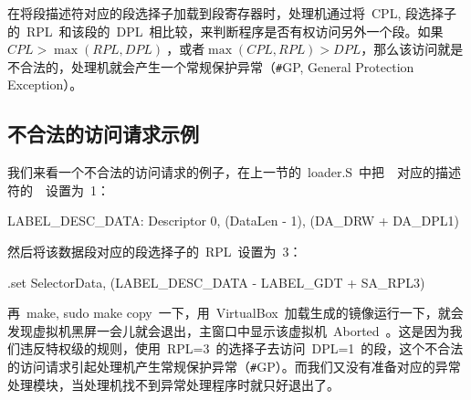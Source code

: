 在将段描述符对应的段选择子加载到段寄存器时，处理机通过将~CPL, 段选择子的~RPL~和该段的~DPL~相比较，来判断程序是否有权访问另外一个段。如果~$CPL>\max{(RPL, DPL)}~$，或者$\max{(CPL, RPL)}>DPL$，那么该访问就是不合法的，处理机就会产生一个常规保护异常（\texttt{\#}GP, General Protection Exception）。

\subsection{不合法的访问请求示例}

我们来看一个不合法的访问请求的例子，在上一节的~loader.S~中把~~对应的描述符的~~设置为~1：
\begin{Command}
LABEL_DESC_DATA:    Descriptor        0,      (DataLen - 1), (DA_DRW + DA_DPL1)
\end{Command}

然后将该数据段对应的段选择子的~RPL~设置为~3：
\begin{Command}
.set    SelectorData,   (LABEL_DESC_DATA   - LABEL_GDT + SA_RPL3)
\end{Command}

再~make, sudo make copy~一下，用~VirtualBox~加载生成的镜像运行一下，就会发现虚拟机黑屏一会儿就会退出，主窗口中显示该虚拟机~Aborted~。这是因为我们违反特权级的规则，使用~RPL=3~的选择子去访问~DPL=1~的段，这个不合法的访问请求引起处理机产生常规保护异常（\texttt{\#}GP）。而我们又没有准备对应的异常处理模块，当处理机找不到异常处理程序时就只好退出了。